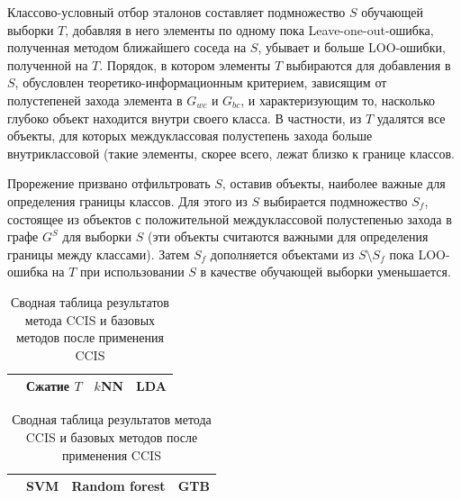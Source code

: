 Классово-условный отбор эталонов составляет подмножество \(S\) обучающей выборки \(T\), добавляя в него элементы по одному пока Leave-one-out-ошибка, полученная методом ближайшего соседа на \(S\), убывает и больше LOO-ошибки, полученной на \(T\). Порядок, в котором элементы \(T\) выбираются для добавления в \(S\), обусловлен теоретико-информационным критерием, зависящим от полустепеней захода элемента в \(G_{wc}\) и \(G_{bc}\), и характеризующим то, насколько глубоко объект находится внутри своего класса. В частности, из \(T\) удалятся все объекты, для которых междуклассовая полустепень захода больше внутриклассовой (такие элементы, скорее всего, лежат близко к границе классов.

Прорежение призвано отфильтровать \(S\), оставив объекты, наиболее важные для определения границы классов. Для этого из \(S\) выбирается подмножество \(S_f\), состоящее из объектов с положительной междуклассовой полустепенью захода в графе \(G^S\) для выборки \(S\) (эти объекты считаются важными для определения границы между классами). Затем \(S_f\) дополняется объектами из \(S\setminus S_f\) пока LOO-ошибка на \(T\) при использовании \(S\) в качестве обучающей выборки уменьшается.

\begin{table}[h!]
    \centering
    \begin{tabular}{|c||c||c|c|}
    \cline{2-4}
    \multicolumn{1}{c||}{} & Сжатие \(T\) & \(k\)NN & LDA \\
    \hline \hline
	
\end{tabular}
\newline \vspace*{0.5cm} \newline
\begin{tabular}{|c||c|c|c|}
    \cline{2-4}
    \multicolumn{1}{c||}{} & SVM & Random forest & GTB \\
    \hline \hline
	
    \end{tabular}
    \caption{Сводная таблица результатов метода CCIS и базовых методов после применения CCIS}
    \label{table:ccis-results}
\end{table}

